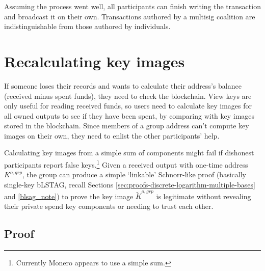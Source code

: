 Assuming the process went well, all participants can finish writing the transaction and broadcast it on their own. Transactions authored by a multisig coalition are indistinguishable from those authored by individuals.



\section{Recalculating key images}
\label{sec:recalculating-key-images-multisig}

If someone loses their records and wants to calculate their address's balance (received minus spent funds), they need to check the blockchain. View keys are only useful for reading received funds, so users need to calculate key images for all owned outputs to see if they have been spent, by comparing with key images stored in the blockchain. Since members of a group address can't compute key images on their own, they need to enlist the other participants' help.

Calculating key images from a simple sum of components might fail if dishonest participants report false keys.\footnote{Currently Monero appears to use a simple sum.} Given a received output with one-time address $K^{o,grp}$, the group can produce a simple `linkable' Schnorr-like proof (basically single-key bLSTAG, recall Sections \ref{sec:proofs-discrete-logarithm-multiple-bases} and \ref{blsag_note}) to prove the key image $\tilde{K}^{o,grp}$ is legitimate without revealing their private spend key components or needing to trust each other.


\subsection*{Proof}


